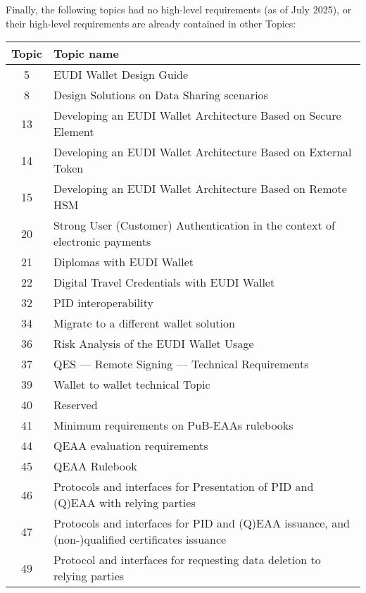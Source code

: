 Finally, the following topics had no high-level requirements (as of July 2025), or their high-level requirements are already contained in other Topics:

\footnotesize
\begin{longtable}{|c|p{}|}
\hline
\textbf{Topic} & \textbf{Topic name} \\
\hline
\endhead

5 & EUDI Wallet Design Guide \\
\hline

8 & Design Solutions on Data Sharing scenarios \\
\hline

13 & Developing an EUDI Wallet Architecture Based on Secure Element \\
\hline

14 & Developing an EUDI Wallet Architecture Based on External Token \\
\hline

15 & Developing an EUDI Wallet Architecture Based on Remote HSM \\
\hline

20 & Strong User (Customer) Authentication in the context of electronic payments \\
\hline

21 & Diplomas with EUDI Wallet \\
\hline

22 & Digital Travel Credentials with EUDI Wallet \\
\hline

32 & PID interoperability \\
\hline

34 & Migrate to a different wallet solution \\
\hline

36 & Risk Analysis of the EUDI Wallet Usage \\
\hline

37 & QES — Remote Signing — Technical Requirements \\
\hline

39 & Wallet to wallet technical Topic \\
\hline

40 & Reserved \\
\hline

41 & Minimum requirements on PuB-EAAs rulebooks \\
\hline

44 & QEAA evaluation requirements \\
\hline

45 & QEAA Rulebook \\
\hline

46 & Protocols and interfaces for Presentation of PID and (Q)EAA with relying parties \\
\hline

47 & Protocols and interfaces for PID and (Q)EAA issuance, and (non-)qualified certificates issuance \\
\hline

49 & Protocol and interfaces for requesting data deletion to relying parties \\
\hline

\end{longtable}


